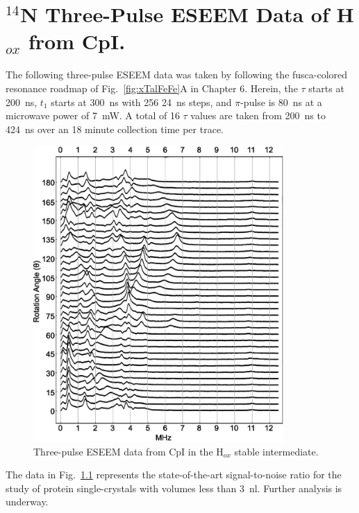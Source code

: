 \chapter[ESEEM Data of Hox from CpI.]{$^{14}$N Three-Pulse ESEEM Data of H$_{ox}$ from CpI.}

The following three-pulse ESEEM data was taken by following the fusca-colored resonance roadmap of Fig.~\ref{fig:xTalFeFe}A in Chapter 6. Herein, the $\tau$ starts at 200~ns, $t_1$ starts at 300~ns with 256 24~ns steps, and $\pi$-pulse is 80~ns at a microwave power of 7~mW. A total of 16 $\tau$ values are taken from 200~ns to 424~ns over an 18 minute collection time per trace.

\begin{figure}[ht]
 \centering
 \includegraphics[width=0.85\textwidth]{Kapitel/Appendix/ESEEMFirstPeakA.eps}
 \caption[Preliminary Three-Pulse ESEEM Data of Hox]{Three-pulse ESEEM data from CpI in the H$_{ox}$ stable intermediate.}
 \label{fig-E:ESEEM}
\end{figure}

The data in Fig.~\ref{fig-E:ESEEM} represents the state-of-the-art signal-to-noise ratio for the study of protein single-crystals with volumes less than 3~nl. Further analysis is underway.

